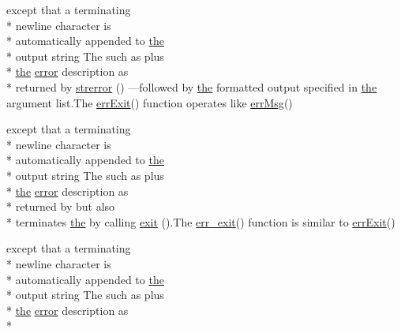 \begin{DoxyCompactItemize}
except that a terminating \\*
newline character is \\*
automatically appended to \hyperlink{ClientServer_2server_2Makefile_a09c6b60bb7451f9136e25140ffdff6bd}{the} \\*
output string The such as plus \\*
\hyperlink{ClientServer_2server_2Makefile_a09c6b60bb7451f9136e25140ffdff6bd}{the} \hyperlink{common_2README_a80171b13188418b4328f9247d3aff3d2}{error} description as \\*
returned by \hyperlink{common_2README_af3164892dd3bd1beaa3a2b70e01edcd9}{strerror} () —followed by \hyperlink{ClientServer_2server_2Makefile_a09c6b60bb7451f9136e25140ffdff6bd}{the} formatted output specified in \hyperlink{ClientServer_2server_2Makefile_a09c6b60bb7451f9136e25140ffdff6bd}{the} argument list.\-The \hyperlink{error__functions_8c_a9353730adacb3417493e841dace8708b}{err\-Exit}() function operates like \hyperlink{error__functions_8c_a46c1ae408432a2c70da4402236454a5f}{err\-Msg}()
\item 
except that a terminating \\*
newline character is \\*
automatically appended to \hyperlink{ClientServer_2server_2Makefile_a09c6b60bb7451f9136e25140ffdff6bd}{the} \\*
output string The such as plus \\*
\hyperlink{ClientServer_2server_2Makefile_a09c6b60bb7451f9136e25140ffdff6bd}{the} \hyperlink{common_2README_a80171b13188418b4328f9247d3aff3d2}{error} description as \\*
returned by but also \\*
terminates \hyperlink{ClientServer_2server_2Makefile_a09c6b60bb7451f9136e25140ffdff6bd}{the} by calling \hyperlink{common_2README_a85c39bfe84eed5e1d7dae87fb0018669}{exit} ().The \hyperlink{error__functions_8c_ad83bc66851be4582ec97ba670a95fa0a}{err\-\_\-exit}() function is similar to \hyperlink{error__functions_8c_a9353730adacb3417493e841dace8708b}{err\-Exit}()
\item 
except that a terminating \\*
newline character is \\*
automatically appended to \hyperlink{ClientServer_2server_2Makefile_a09c6b60bb7451f9136e25140ffdff6bd}{the} \\*
output string The such as plus \\*
\hyperlink{ClientServer_2server_2Makefile_a09c6b60bb7451f9136e25140ffdff6bd}{the} \hyperlink{common_2README_a80171b13188418b4328f9247d3aff3d2}{error} description as \\*

\end{DoxyCompactItemize}
